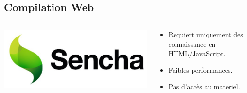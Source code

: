 \documentclass{beamer}
\begin{document}
\subsection{Compilation Web}
\begin{frame}
\begin{columns}[c]
  \begin{column}{0.5\textwidth}
    \begin{center}
      \includegraphics[scale=0.3]{sencha}
    \end{center}
  \end{column}
  \begin{column}{0.5\textwidth}
    \begin{itemize}
      \item Requiert uniquement des connaissance en HTML/JavaScript.
\item Faibles performances.
\item Pas d'accès au materiel.
    \end{itemize}
  \end{column}
\end{columns}
\end{frame}
\end{document}
